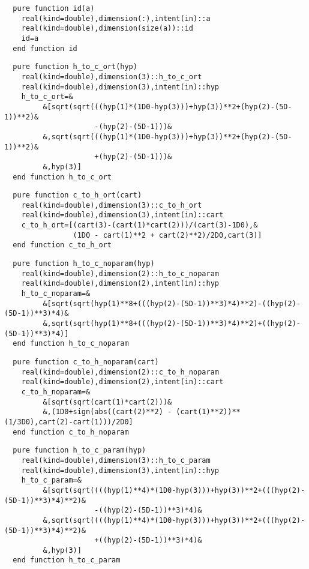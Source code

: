 \begin{Verbatim}
  pure function id(a)
    real(kind=double),dimension(:),intent(in)::a
    real(kind=double),dimension(size(a))::id
    id=a
  end function id
\end{Verbatim}

\begin{Verbatim}
  pure function h_to_c_ort(hyp)
    real(kind=double),dimension(3)::h_to_c_ort
    real(kind=double),dimension(3),intent(in)::hyp
    h_to_c_ort=&
         &[sqrt(sqrt(((hyp(1)*(1D0-hyp(3)))+hyp(3))**2+(hyp(2)-(5D-1))**2)&
                     -(hyp(2)-(5D-1)))&
         &,sqrt(sqrt(((hyp(1)*(1D0-hyp(3)))+hyp(3))**2+(hyp(2)-(5D-1))**2)&
                     +(hyp(2)-(5D-1)))&
         &,hyp(3)]
  end function h_to_c_ort
\end{Verbatim}
  
\begin{Verbatim}
  pure function c_to_h_ort(cart)
    real(kind=double),dimension(3)::c_to_h_ort
    real(kind=double),dimension(3),intent(in)::cart
    c_to_h_ort=[(cart(3)-(cart(1)*cart(2)))/(cart(3)-1D0),&
                (1D0 - cart(1)**2 + cart(2)**2)/2D0,cart(3)]
  end function c_to_h_ort
\end{Verbatim}

\begin{Verbatim}
  pure function h_to_c_noparam(hyp)
    real(kind=double),dimension(2)::h_to_c_noparam
    real(kind=double),dimension(2),intent(in)::hyp
    h_to_c_noparam=&
         &[sqrt(sqrt(hyp(1)**8+(((hyp(2)-(5D-1))**3)*4)**2)-((hyp(2)-(5D-1))**3)*4)&
         &,sqrt(sqrt(hyp(1)**8+(((hyp(2)-(5D-1))**3)*4)**2)+((hyp(2)-(5D-1))**3)*4)]
  end function h_to_c_noparam
\end{Verbatim}

\begin{Verbatim}
  pure function c_to_h_noparam(cart)
    real(kind=double),dimension(2)::c_to_h_noparam
    real(kind=double),dimension(2),intent(in)::cart
    c_to_h_noparam=&
         &[sqrt(sqrt(cart(1)*cart(2)))&
         &,(1D0+sign(abs((cart(2)**2) - (cart(1)**2))**(1/3D0),cart(2)-cart(1)))/2D0]
  end function c_to_h_noparam
\end{Verbatim}

\begin{Verbatim}
  pure function h_to_c_param(hyp)
    real(kind=double),dimension(3)::h_to_c_param
    real(kind=double),dimension(3),intent(in)::hyp
    h_to_c_param=&
         &[sqrt(sqrt((((hyp(1)**4)*(1D0-hyp(3)))+hyp(3))**2+(((hyp(2)-(5D-1))**3)*4)**2)&
                     -((hyp(2)-(5D-1))**3)*4)&
         &,sqrt(sqrt((((hyp(1)**4)*(1D0-hyp(3)))+hyp(3))**2+(((hyp(2)-(5D-1))**3)*4)**2)&
                     +((hyp(2)-(5D-1))**3)*4)&
         &,hyp(3)]
  end function h_to_c_param
\end{Verbatim}
  
